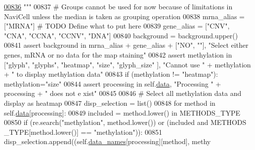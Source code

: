 \begin{DoxyCode}
\hypertarget{navicom_8py_source_l00836}{}\hyperlink{classnavicom_1_1navicom_1_1NaviCom_a018f936de625af8a5dd7e8250ede6483}{00836} \textcolor{stringliteral}{        """}
00837         \textcolor{comment}{# Groups cannot be used for now because of limitations in NaviCell unless
       the median is taken as grouping operation}
00838         mrna\_alias = [\textcolor{stringliteral}{"MRNA"}] \textcolor{comment}{# TODO Define what to put here}
00839         gene\_alias = [\textcolor{stringliteral}{"CNV"}, \textcolor{stringliteral}{"CNA"}, \textcolor{stringliteral}{"CCNA"}, \textcolor{stringliteral}{"CCNV"}, \textcolor{stringliteral}{"DNA"}]
00840         background = background.upper()
00841         \textcolor{keyword}{assert} background \textcolor{keywordflow}{in} mrna\_alias + gene\_alias + [\textcolor{stringliteral}{"NO"}, \textcolor{stringliteral}{""}], \textcolor{stringliteral}{"Select either
       genes, mRNA or no data for the map staining"}
00842         \textcolor{keyword}{assert} methylation \textcolor{keywordflow}{in} [\textcolor{stringliteral}{"glyph"}, \textcolor{stringliteral}{"glyphs"}, \textcolor{stringliteral}{"heatmap"}, \textcolor{stringliteral}{"size"}, \textcolor{stringliteral}{"glyph\_size"
      }], \textcolor{stringliteral}{"Cannot use "} + methylation + \textcolor{stringliteral}{" to display methylation data"}
00843         \textcolor{keywordflow}{if} (methylation != \textcolor{stringliteral}{"heatmap"}): methylation=\textcolor{stringliteral}{"size"}
00844         \textcolor{keyword}{assert} processing \textcolor{keywordflow}{in} self.\hyperlink{classnavicom_1_1navicom_1_1NaviCom_aa1abff245573ed8406c6bddb4596f093}{data}, \textcolor{stringliteral}{"Processing "} + processing + \textcolor{stringliteral}{" does not e
      xist"}
00845 
00846         \textcolor{comment}{# Select all methylation data and display as heatmap}
00847         disp\_selection = list()
00848         \textcolor{keywordflow}{for} method \textcolor{keywordflow}{in} self.\hyperlink{classnavicom_1_1navicom_1_1NaviCom_aa1abff245573ed8406c6bddb4596f093}{data}[processing]:
00849             included = method.lower() \textcolor{keywordflow}{in} METHODS\_TYPE
00850             \textcolor{keywordflow}{if} (re.search(\textcolor{stringliteral}{"methylation"}, method.lower()) \textcolor{keywordflow}{or} (included \textcolor{keywordflow}{and} METHODS
      \_TYPE[method.lower()] == \textcolor{stringliteral}{"methylation"})):
00851                 disp\_selection.append((self.\hyperlink{classnavicom_1_1navicom_1_1NaviCom_a68646454fe1481b0065d2f43548319df}{data_names}[processing][method], methy

\end{DoxyCode}
